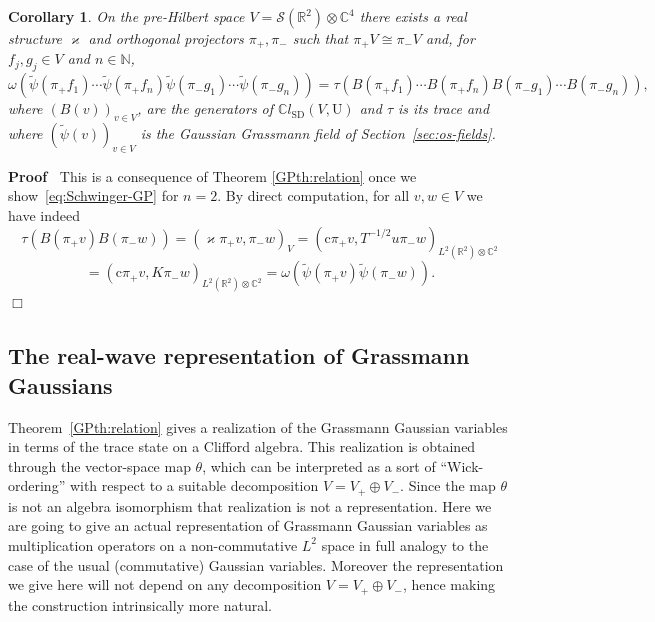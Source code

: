 \documentclass{article}
\newcommand{\tmop}[1]{\ensuremath{\operatorname{#1}}}
\newenvironment{proof}{\noindent\textbf{Proof\ }}{\hspace*{\fill}$\Box$\medskip}
\newtheorem{corollary}[theorem]{Corollary}
\begin{document}
\begin{corollary}
  \label{GPcor:schwinger}On the pre-Hilbert space $V =\mathcal{S}
  (\mathbb{R}^2) \otimes \mathbb{C}^4$ there exists a real structure
  $\varkappa$ and orthogonal projectors $\pi_+, \pi_-$ such that $\pi_+ V
  \cong \pi_- V$ and, for $f_j, g_j \in V$ and $n \in \mathbb{N}$,
  \begin{equation}
    \omega (\tilde{\psi} (\pi_+ f_1) \cdots \tilde{\psi} (\pi_+ f_n)
    \tilde{\psi} (\pi_- g_1) \cdots \tilde{\psi} (\pi_- g_n)) = \tau (B (\pi_+
    f_1) \cdots B (\pi_+ f_n) B (\pi_- g_1) \cdots B (\pi_- g_n)),
    \label{eq:Schwinger-GP}
  \end{equation}
  where $(B (v))_{v \in V}$, are the generators of $\mathbb{C}l_{\tmop{SD}}
  (V, \mathrm{U})$ and $\tau$ is its trace and where $(\tilde{\psi} (v))_{v
  \in V}$ is the Gaussian Grassmann field of Section~\ref{sec:os-fields}.
\end{corollary}

\begin{proof}
  This is a consequence of Theorem \ref{GPth:relation} once we
  show~{\eqref{eq:Schwinger-GP}} for $n = 2$. By direct computation, for all
  $v, w \in V$ we have indeed
  \[ \tau (B (\pi_+ v) B (\pi_- w)) = (\varkappa \pi_+ v, \pi_- w)_V =
     (\mathrm{c} \pi_+ v, T^{- 1 / 2} u \pi_- w)_{L^2 (\mathbb{R}^2) \otimes
     \mathbb{C}^2} \]
  \[ = (\mathrm{c} \pi_+ v, K \pi_- w)_{L^2 (\mathbb{R}^2) \otimes
     \mathbb{C}^2} = \omega (\tilde{\psi} (\pi_+ v) \tilde{\psi} (\pi_- w)) .
  \]
\end{proof}

\subsection{The real-wave representation of Grassmann Gaussians}

Theorem~\ref{GPth:relation} gives a realization of the Grassmann Gaussian
variables in terms of the trace state on a Clifford algebra. This realization
is obtained through the vector-space map $\theta$, which can be interpreted as
a sort of ``Wick-ordering'' with respect to a suitable decomposition $V = V_+
\oplus V_-$. Since the map $\theta$ is not an algebra isomorphism that
realization is not a representation. Here we are going to give an actual
representation of Grassmann Gaussian variables as multiplication operators on
a non-commutative $L^2$ space in full analogy to the case of the usual
(commutative) Gaussian variables. Moreover the representation we give here
will not depend on any decomposition $V = V_+ \oplus V_-$, hence making the
construction intrinsically more natural.
\end{document}
